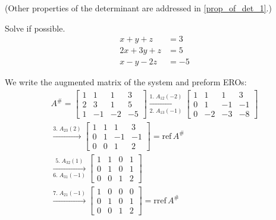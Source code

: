 \documentclass[../main.tex]{subfiles}
\begin{document}
(Other properties of the determinant are addressed in \ref{prop_of_det_1}.)

\begin{example}[]
    Solve if possible.
    \begin{align*}
        x + y + z &= 3 \\
        2x + 3y + z &= 5 \\
        x - y -2z &= -5
    \end{align*}

    We write the augmented matrix of the system and preform EROs:
    \begin{gather*}
        A^\# =
        \begin{bmatrix}
            1 & 1 & 1 & 3 \\
            2 & 3 & 1 & 5 \\
            1 & -1 & -2 & -5
        \end{bmatrix}
        \xrightarrow[2. \; A_{13}(-1)]{1. \; A_{12}(-2)}
        \begin{bmatrix}
            1 & 1 & 1 & 3 \\
            0 & 1 & -1 & -1 \\
            0 & -2 & -3 & -8
        \end{bmatrix} \\
        \xrightarrow{3. \; A_{23}(2)}
        \begin{bmatrix}
            1 & 1 & 1 & 3 \\
            0 & 1 & -1 & -1 \\
            0 & 0 & 1 & 2
        \end{bmatrix}
        = \text{ref} \, A^\# \\
        \xrightarrow[6. \; A_{31}(-1)]{5. \; A_{32}(1)}
        \begin{bmatrix}
            1 & 1 & 0 & 1 \\
            0 & 1 & 0 & 1 \\
            0 & 0 & 1 & 2
        \end{bmatrix} \\
        \xrightarrow{7. \; A_{21}(-1)}
        \begin{bmatrix}
            1 & 0 & 0 & 0 \\
            0 & 1 & 0 & 1 \\
            0 & 0 & 1 & 2
        \end{bmatrix}
        = \text{rref} \, A^\#
    \end{gather*}


\end{example}
\end{document}

